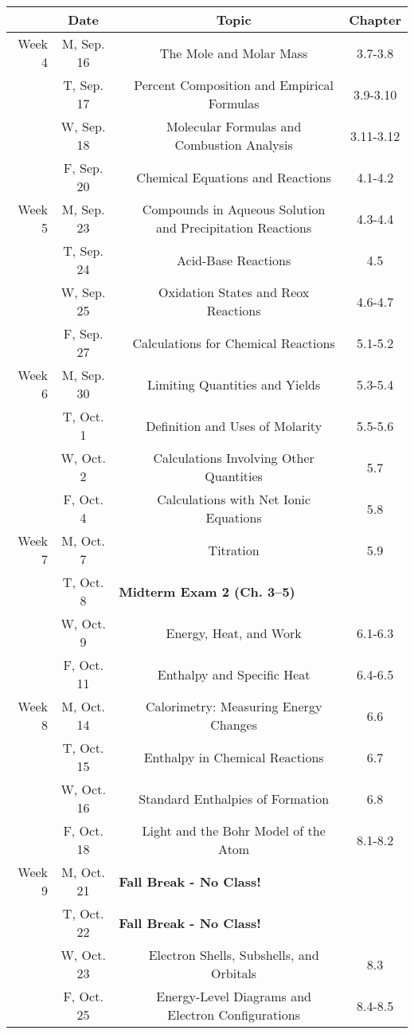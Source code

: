\documentclass[12pt, letterpaper]{article}
\begin{document}
\noindent\hspace{-2.5em}
\begin{tabular}{rcccc}
& Date && Topic & Chapter\\
\midrule
Week 4 & M, Sep. 16&& The Mole and Molar Mass & 3.7-3.8\\
& T, Sep. 17&& Percent Composition and Empirical Formulas & 3.9-3.10\\
& W, Sep. 18&& Molecular Formulas and Combustion Analysis & 3.11-3.12\\
& F, Sep. 20&& Chemical Equations and Reactions & 4.1-4.2\\
\midrule
Week 5 & M, Sep. 23&& Compounds in Aqueous Solution and Precipitation Reactions & 4.3-4.4\\
& T, Sep. 24&& Acid-Base Reactions & 4.5\\
& W, Sep. 25&& Oxidation States and Reox Reactions & 4.6-4.7\\
& F, Sep. 27&& Calculations for Chemical Reactions & 5.1-5.2\\
\midrule
Week 6 & M, Sep. 30&& Limiting Quantities and Yields & 5.3-5.4\\
& T, Oct. 1&& Definition and Uses of Molarity & 5.5-5.6\\
& W, Oct. 2&& Calculations Involving Other Quantities & 5.7\\
& F, Oct. 4&& Calculations with Net Ionic Equations & 5.8\\
\midrule
Week 7 & M, Oct. 7&& Titration & 5.9\\
& T, Oct. 8& \multicolumn{3}{l}{\textbf{Midterm Exam 2 (Ch. 3--5)}}\\
& W, Oct. 9&& Energy, Heat, and Work & 6.1-6.3\\
& F, Oct. 11&& Enthalpy and Specific Heat & 6.4-6.5\\
\midrule
Week 8 & M, Oct. 14&& Calorimetry: Measuring Energy Changes & 6.6\\
& T, Oct. 15&& Enthalpy in Chemical Reactions & 6.7\\
& W, Oct. 16&& Standard Enthalpies of Formation & 6.8\\
& F, Oct. 18&& Light and the Bohr Model of the Atom & 8.1-8.2\\
\midrule
Week 9 & M, Oct. 21& \multicolumn{3}{l}{\textbf{Fall Break - No Class!}}\\
& T, Oct. 22& \multicolumn{3}{l}{\textbf{Fall Break - No Class!}}\\
& W, Oct. 23&& Electron Shells, Subshells, and Orbitals & 8.3\\
& F, Oct. 25&& Energy-Level Diagrams and Electron Configurations & 8.4-8.5\\
\end{tabular}
\end{document}
